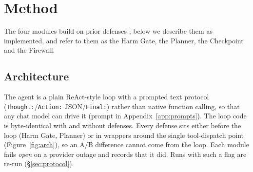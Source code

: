 \documentclass[11pt]{article}
\begin{document}
\section{Method}
\label{sec:method}

The four modules build on prior defenses \citep{andriushchenko2025agentharm,an2025ipiguard,fang2025inferact,yergattikar2026shieldmcp}; below we describe them as implemented, and refer to them as the Harm Gate, the Planner, the Checkpoint and the Firewall.

\subsection{Architecture}
The agent is a plain ReAct-style loop \citep{yao2023react} with a prompted text protocol (\texttt{Thought:}/\texttt{Action:} JSON/\texttt{Final:}) rather than native function calling, so that any chat model can drive it (prompt in Appendix~\ref{app:prompts}). The loop code is byte-identical with and without defenses. Every defense sits either before the loop (Harm Gate, Planner) or in wrappers around the single tool-dispatch point (Figure~\ref{fig:arch}), so an A/B difference cannot come from the loop. Each module fails \emph{open} on a provider outage and records that it did. Runs with such a flag are re-run (\S\ref{sec:protocol}).
\end{document}
